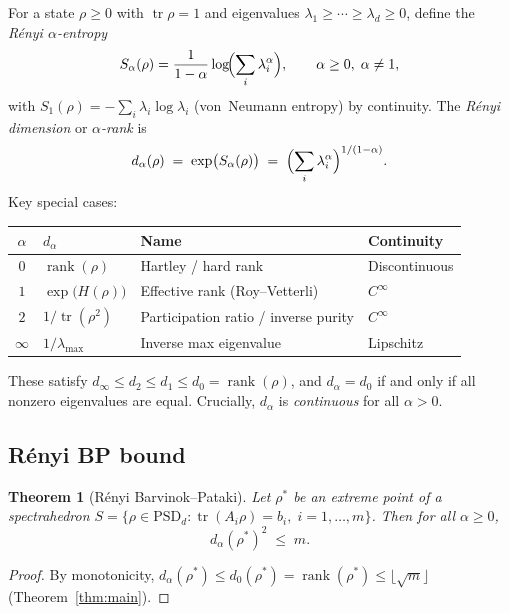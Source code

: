 \documentclass[11pt,a4paper]{article}
\newtheorem{theorem}{Theorem}
\theoremstyle{definition}
\begin{document}
For a state $\rho \geq 0$ with $\operatorname{tr}\rho = 1$ and eigenvalues
$\lambda_1 \geq \cdots \geq \lambda_d \geq 0$, define the
\emph{R\'enyi $\alpha$-entropy}
\[
  S_\alpha(\rho) = \frac{1}{1-\alpha}
  \log\!\Bigl(\sum_{i} \lambda_i^\alpha\Bigr),
  \qquad \alpha \geq 0,\; \alpha \neq 1,
\]
with $S_1(\rho) = -\sum_i \lambda_i \log \lambda_i$ (von~Neumann entropy)
by continuity.  The \emph{R\'enyi dimension} or \emph{$\alpha$-rank} is
\[
  d_\alpha(\rho) \;=\; \exp\bigl(S_\alpha(\rho)\bigr)
  \;=\; \Bigl(\sum_i \lambda_i^\alpha\Bigr)^{1/(1-\alpha)}.
\]
Key special cases:
\begin{center}
\renewcommand{\arraystretch}{1.2}
\begin{tabular}{clll}
\toprule
$\alpha$ & $d_\alpha$ & Name & Continuity \\
\midrule
$0$ & $\operatorname{rank}(\rho)$ & Hartley / hard rank
    & Discontinuous \\
$1$ & $\exp\bigl(H(\rho)\bigr)$ & Effective rank (Roy--Vetterli)
    & $C^\infty$ \\
$2$ & $1/\operatorname{tr}(\rho^2)$ & Participation ratio / inverse purity
    & $C^\infty$ \\
$\infty$ & $1/\lambda_{\max}$ & Inverse max eigenvalue
    & Lipschitz \\
\bottomrule
\end{tabular}
\end{center}
These satisfy $d_\infty \leq d_2 \leq d_1 \leq d_0 = \operatorname{rank}(\rho)$,
and $d_\alpha = d_0$ if and only if all nonzero eigenvalues are equal.
Crucially, $d_\alpha$ is \emph{continuous} for all $\alpha > 0$.

\subsection{R\'enyi BP bound}

\begin{theorem}[R\'enyi Barvinok--Pataki]
\label{thm:renyi_bp}
Let\/ $\rho^*$ be an extreme point of a spectrahedron
$S = \{\rho \in \mathrm{PSD}_d : \operatorname{tr}(A_i\rho) = b_i,\;
i=1,\ldots,m\}$.  Then for all $\alpha \geq 0$,
\[
  d_\alpha(\rho^*)^2 \;\leq\; m.
\]
\end{theorem}

\begin{proof}
By monotonicity, $d_\alpha(\rho^*) \leq d_0(\rho^*) = \operatorname{rank}(\rho^*)
\leq \lfloor\sqrt{m}\rfloor$ (Theorem~\ref{thm:main}).
\end{proof}
\end{document}
